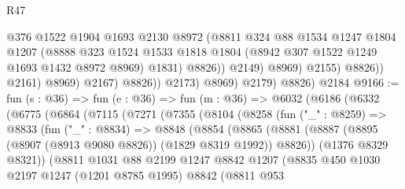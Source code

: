 \begin{lexlean}{R47}
\begin{coremodule}
                                  @376
                                  @1522
                                  @1904
                                  @1693
                                  @2130
                                  @8972
                                  (@8811
                                    @324
                                    @88
                                    @1534
                                    @1247
                                    @1804
                                    @1207
                                    (@8888
                                      @323
                                      @1524
                                      @1533
                                      @1818
                                      @1804
                                      (@8942 @307 @1522 @1249 @1693 @1432 @8972 @8969)
                                      @1831)
                                    @8826))
                                @2149)
                              @8969)
                            @2155)
                          @8826))
                      @2161)
                    @8969)
                  @2167)
                @8826))
            @2173)
          @8969)
        @2179)
      @8826)
    @2184
@9166 := fun (s : @36) =>
  fun (e : @36) =>
  fun (m : @36) =>
  @6032
    (@6186
      (@6332
        (@6775
          (@6864
            (@7115
              (@7271
                (@7355
                  (@8104
                    (@8258
                      (fun ("_" : @8259) =>
                      @8833
                        (fun ("_" : @8834) =>
                        @8848
                          (@8854
                            (@8865
                              (@8881
                                (@8887
                                  (@8895 (@8907 (@8913 @9080 @8826)) (@1829 @8319 @1992))
                                  @8826))
                              (@1376 @8329 @8321))
                            (@8811
                              @1031
                              @88
                              @2199
                              @1247
                              @8842
                              @1207
                              (@8835
                                @450
                                @1030
                                @2197
                                @1247
                                (@1201 @8785 @1995)
                                @8842
                                (@8811
                                  @953

\end{coremodule}
\end{lexlean}
